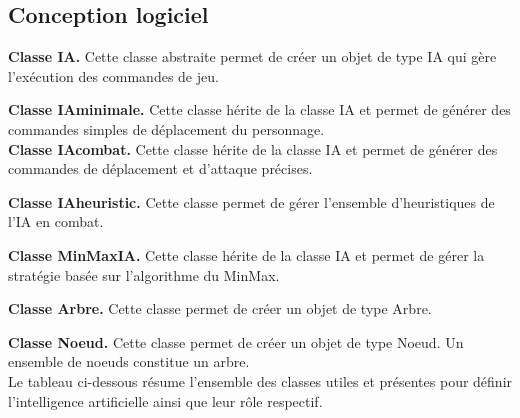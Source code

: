 \documentclass[11pt, a4paper]{article}
\begin{document}
\subsection{Conception logiciel}
\textbf{Classe IA.} Cette classe abstraite permet de créer un objet de type IA qui gère l'exécution des commandes de jeu.

\textbf{Classe IAminimale.} Cette classe hérite de la classe IA et permet de générer des commandes simples de déplacement du personnage.\\

\textbf{Classe IAcombat.} Cette classe hérite de la classe IA et permet de générer des commandes de déplacement et d'attaque précises.

\textbf{Classe IAheuristic.} Cette classe permet de gérer l'ensemble d'heuristiques de l'IA en combat.

\textbf{Classe MinMaxIA.} Cette classe hérite de la classe IA et permet de gérer la stratégie basée sur l'algorithme du MinMax.

\textbf{Classe Arbre.} Cette classe permet de créer un objet de type Arbre.

\textbf{Classe Noeud.} Cette classe permet de créer un objet de type Noeud. Un ensemble de noeuds constitue un arbre.\\

Le tableau ci-dessous résume l'ensemble des classes utiles et présentes pour définir l'intelligence artificielle ainsi que leur rôle respectif.\\
\end{document}
